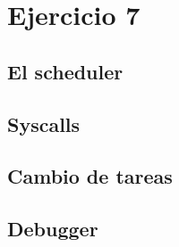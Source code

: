 \section{Ejercicio 7}

\subsection{El scheduler}

\subsection{Syscalls}

\subsection{Cambio de tareas}

\subsection{Debugger}

